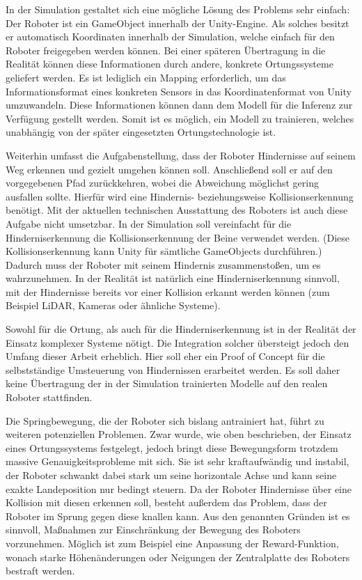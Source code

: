 In der Simulation gestaltet sich eine mögliche Lösung des Problems sehr einfach: Der Roboter ist ein GameObject innerhalb der Unity-Engine.
Als solches besitzt er automatisch Koordinaten innerhalb der Simulation, welche einfach für den Roboter freigegeben werden können.
Bei einer späteren Übertragung in die Realität können diese Informationen durch andere, konkrete Ortungssysteme geliefert werden.
Es ist lediglich ein Mapping erforderlich, um das Informationsformat eines konkreten Sensors in das Koordinatenformat von Unity umzuwandeln.
Diese Informationen können dann dem Modell für die Inferenz zur Verfügung gestellt werden.
Somit ist es möglich, ein Modell zu trainieren, welches unabhängig von der später eingesetzten Ortungstechnologie ist.

Weiterhin umfasst die Aufgabenstellung, dass der Roboter Hindernisse auf seinem Weg erkennen und gezielt umgehen können soll.
Anschließend soll er auf den vorgegebenen Pfad zurückkehren, wobei die Abweichung möglichst gering ausfallen sollte.
Hierfür wird eine Hindernis- beziehungsweise Kollisionserkennung benötigt.
Mit der aktuellen technischen Ausstattung des Roboters ist auch diese Aufgabe nicht umsetzbar.
In der Simulation soll vereinfacht für die Hinderniserkennung die Kollisionserkennung der Beine verwendet werden.
(Diese Kollisionserkennung kann Unity für sämtliche GameObjects durchführen.)
Dadurch muss der Roboter mit seinem Hindernis zusammenstoßen, um es wahrzunehmen.
In der Realität ist natürlich eine Hinderniserkennung sinnvoll, mit der Hindernisse bereits vor einer Kollision erkannt werden können (zum Beispiel LiDAR, Kameras oder ähnliche Systeme).

Sowohl für die Ortung, als auch für die Hinderniserkennung ist in der Realität der Einsatz komplexer Systeme nötigt.
Die Integration solcher übersteigt jedoch den Umfang dieser Arbeit erheblich.
Hier soll eher ein Proof of Concept für die selbstständige Umsteuerung von Hindernissen erarbeitet werden.
Es soll daher keine Übertragung der in der Simulation trainierten Modelle auf den realen Roboter stattfinden.

Die Springbewegung, die der Roboter sich bislang antrainiert hat, führt zu weiteren potenziellen Problemen.
Zwar wurde, wie oben beschrieben, der Einsatz eines Ortungssystems festgelegt, jedoch bringt diese Bewegungsform trotzdem massive Genauigkeitsprobleme mit sich. 
Sie ist sehr kraftaufwändig und instabil, der Roboter schwankt dabei stark um seine horizontale Achse und kann seine exakte Landeposition nur bedingt steuern.
Da der Roboter Hindernisse über eine Kollision mit diesen erkennen soll, besteht außerdem das Problem, dass der Roboter im Sprung gegen diese knallen kann.
Aus den genannten Gründen ist es sinnvoll, Maßnahmen zur Einschränkung der Bewegung des Roboters vorzunehmen.
Möglich ist zum Beispiel eine Anpassung der Reward-Funktion, wonach starke Höhenänderungen oder Neigungen der Zentralplatte des Roboters bestraft werden.

